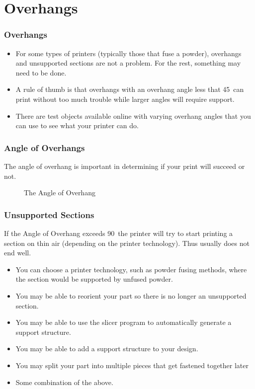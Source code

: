\documentclass[english,10pt]{beamer}
\begin{document}
\section{Overhangs}
\begin{frame}
  \frametitle{Overhangs}
  \begin{itemize}
    \item For some types of printers (typically those that fuse a powder), overhangs and unsupported sections are not a problem.  For the rest, something may need to be done.
    \item A rule of thumb is that overhangs with an overhang angle less that 45\degree\ can print without too much trouble while larger angles will require support.
    \item There are test objects available online with varying overhang angles that you can use to see what your printer can do.
  \end{itemize}
\end{frame}

\begin{frame}
  \frametitle{Angle of Overhangs}
  The angle of overhang is important in determining if your print will succeed or not.
  \begin{figure}
    
    \caption{The Angle of Overhang}
  \end{figure}
\end{frame}

\begin{frame}
  \frametitle{Unsupported Sections}
  If the Angle of Overhang exceeds 90\degree\ the printer will try to start printing a section on thin air (depending on the printer technology).  Thus usually does not end well.
  \begin{itemize}
    \item You can choose a printer technology, such as powder fusing methods, where the section would be supported by unfused powder.
    \item You may be able to reorient your part so there is no longer an unsupported section.
    \item You may be able to use the slicer program to automatically generate a support structure.
    \item You may be able to add a support structure to your design.
    \item You may split your part into multiple pieces that get fastened together later
    \item Some combination of the above.
  \end{itemize}
\end{frame}
\end{document}
